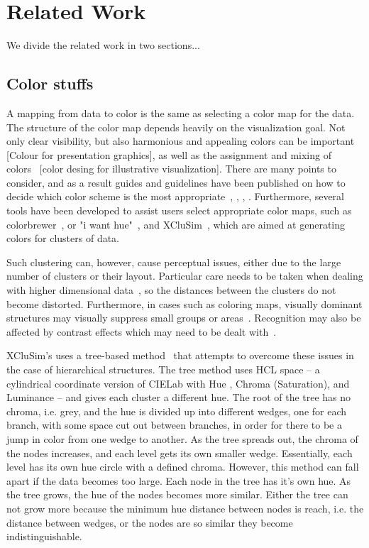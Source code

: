 \documentclass[review,journal]{vgtc}         %
\begin{document}
\section{Related Work}

We divide the related work in two sections...

\subsection{Color stuffs}

A mapping from data to color is the same as selecting a color map for the data. 
The structure of the color map depends heavily on the visualization goal. 
Not only clear visibility, but also harmonious and appealing colors can be important~\cite{ihaka2003colour} [Colour for presentation graphics], as well as the assignment and mixing of colors~\cite{wang2008color} [color desing for illustrative visualization]. 
There are many points to consider, and as a result guides and guidelines have been published on how to decide which color scheme is the most appropriate~\cite{bergman1995rule}, \cite{healey1996choosing}, \cite{bernard2015survey}, \cite{steiger2015explorative}.
Furthermore, several tools have been developed to assist users select appropriate color maps, such as colorbrewer~\cite{harrower2003colorbrewer}, or "i want hue"~\cite{iwanthue}, and XCluSim~\cite{l2015xclusim}, which are aimed at generating colors for clusters of data. 

Such clustering can, however, cause perceptual issues, either due to the large number of clusters or their layout. 
Particular care needs to be taken when dealing with higher dimensional data~\cite{mittelstiidt2014revisiting}, so the distances between the clusters do not become distorted. 
Furthermore, in cases such as coloring maps, visually dominant structures may visually suppress small groups or areas~\cite{lee2013perceptually}.
Recognition may also be affected by contrast effects which may need to be dealt with~\cite{mittelstadt2014methods}.

XCluSim’s uses a tree-based method~\cite{tennekes2014tree} that attempts to overcome these issues in the case of hierarchical structures. 
The tree method uses HCL space – a cylindrical coordinate version of CIELab with Hue , Chroma (Saturation), and Luminance – and gives each cluster a different hue. 
The root of the tree has no chroma, i.e. grey, and the hue is divided up into different wedges, one for each branch, with some space cut out between branches, in order for there to be a jump in color from one wedge to another. 
As the tree spreads out, the chroma of the nodes increases, and each level gets its own smaller wedge. 
Essentially, each level has its own hue circle with a defined chroma. 
However, this method can fall apart if the data becomes too large. Each node in the tree has it's own hue. 
As the tree grows, the hue of the nodes becomes more similar. 
Either the tree can not grow more because the minimum hue distance between nodes is reach, i.e. the distance between wedges, or the nodes are so similar they become indistinguishable. 
\end{document}
